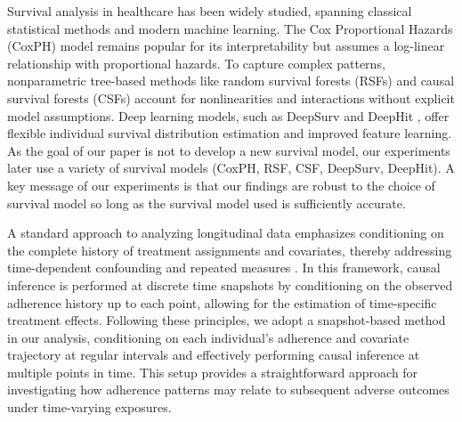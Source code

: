 Survival analysis in healthcare has been widely studied, spanning classical statistical methods and modern machine learning.
The Cox Proportional Hazards (CoxPH) model \citep{cox1972regression} remains popular for its interpretability but assumes a log-linear relationship with proportional hazards.
To capture complex patterns, nonparametric tree-based methods like random survival forests (RSFs) \citep{ishwaran2008random} and causal survival forests (CSFs) \citep{cui2023estimating} account for nonlinearities and interactions without explicit model assumptions.
Deep learning models, such as DeepSurv \citep{katzman2018deepsurv} and DeepHit \citep{lee2018deephit}, offer flexible individual survival distribution estimation and improved feature learning. 
As the goal of our paper is not to develop a new survival model, our experiments later use a variety of survival models (CoxPH, RSF, CSF, DeepSurv, DeepHit). A key message of our experiments is that our findings are robust to the choice of survival model so long as the survival model used is sufficiently accurate.

A standard approach to analyzing longitudinal data emphasizes conditioning on the complete history of treatment assignments and covariates, thereby addressing time-dependent confounding and repeated measures \citep{fitzmaurice2009longitudinal, kennedy2019nonparametric}. 
In this framework, causal inference is performed at discrete time snapshots by conditioning on the observed adherence history up to each point, allowing for the estimation of time-specific treatment effects. 
Following these principles, we adopt a snapshot-based method in our analysis, conditioning on each individual's adherence and covariate trajectory at regular intervals and effectively performing causal inference at multiple points in time. 
This setup provides a straightforward approach for investigating how adherence patterns may relate to subsequent adverse outcomes under time-varying exposures.

